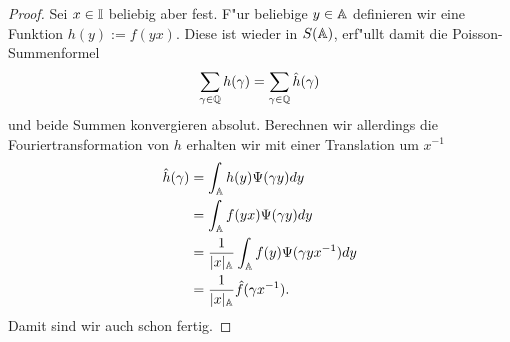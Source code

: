 	\begin{proof}
		Sei $x \in \mathbb{I}$ beliebig aber fest. 
		F"ur beliebige $y \in \mathbb{A}$ definieren wir eine Funktion $h(y):=f(yx)$. Diese ist wieder in $S(\mathbb{A})$, erf"ullt damit die Poisson-Summenformel
		\begin{align*}
			\sum_{\gamma \in \mathbb{Q}}h(\gamma) = \sum_{\gamma \in \mathbb{Q}} \hat{h}(\gamma)
		\end{align*}
		und beide Summen konvergieren absolut.
		Berechnen wir allerdings die Fouriertransformation von $h$ erhalten wir mit einer Translation um $x^{-1}$
		\begin{align*}
			\hat{h}(\gamma) &= \int_{\mathbb{A}}h(y)\Psi(\gamma y)dy \\
							 &= \int_{\mathbb{A}}f(yx)\Psi(\gamma y)dy \\
							 &= \frac{1}{|x|_{\mathbb{A}}} \int_{\mathbb{A}}f(y)\Psi(\gamma y x^{-1})dy \\
							 &= \frac{1}{|x|_{\mathbb{A}}} \hat{f}(\gamma x^{-1}).
		\end{align*}
		Damit sind wir auch schon fertig.
	\end{proof}
	
